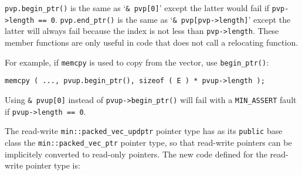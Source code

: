 \documentclass[12pt]{article}
\newcommand{\EOL}{\penalty \exhyphenpenalty}
\newenvironment{indpar}[1][0.3in]%
	{\begin{list}{}%
		     {\setlength{\itemsep}{0in}%
		      \setlength{\topsep}{0in}%
		      \setlength{\parsep}{1ex}%
		      \setlength{\labelwidth}{#1}%
		      \setlength{\leftmargin}{#1}%
		      \addtolength{\leftmargin}{\labelsep}}%
	 \item}%
	{\end{list}}
\begin{document}
\verb|pvp.begin_ptr()| is the same as `\verb|& pvp[0]|'
except the latter would fail if {\tt pvp->\EOL length == 0}.
\verb|pvp.end_ptr()| is the same as `\verb|& pvp[pvp->length]|'
except the latter will always fail because the index is not less than
\verb|pvp->length|.
These member functions are only useful
in code that does not call a relocating function.

For example, if \verb|memcpy| is used to copy
from the vector, use {\tt begin\_\EOL ptr()}:
\begin{indpar}\begin{verbatim}
memcpy ( ..., pvup.begin_ptr(), sizeof ( E ) * pvup->length );
\end{verbatim}\end{indpar}
Using \verb|& pvup[0]| instead of \verb|pvup->begin_ptr()|
will fail with a {\tt MIN\_\EOL ASSERT} fault if {\tt pvup->\EOL length == 0}.

The read-write {\tt min::\EOL packed\_\EOL vec\_\EOL updptr\EARG}
pointer type has as its {\tt public} base class the
{\tt min::\EOL packed\_\EOL vec\_\EOL ptr\EARG} pointer type,
so that read-write pointers can be implicitely converted to
read-only pointers.  The new code defined for the read-write
pointer type is:
\end{document}
